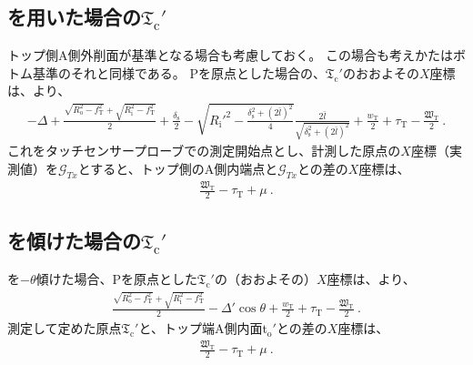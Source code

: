 \clearpage
\modHeadsection{\TopOutcutCenter}


\subsection[\Spacer を用いた場合の\texorpdfstring{$\mathfrak T_\mathrm c'$}{Tc'}]
           {\Spacer を用いた場合の$\boldsymbol{\mathfrak T_\mathrm c'}$}
トップ側A側外削面が基準となる場合も考慮しておく。
この場合も考えかたはボトム基準のそれと同様である。
\TableCenter Pを原点とした場合の、\TopOutcutCenter$\mathfrak T_\mathrm c'$のおおよその$X$座標は、より、
\begin{align*}
  -\Delta+\frac{\sqrt{R_\mathrm o^2-f_\mathrm T^2}+\sqrt{R_\mathrm i^2-f_\mathrm T^2}}2+\frac{\delta_\mathrm s}2
  -\sqrt{R_\mathrm i'^2-\frac{\delta_\mathrm s^2+(2\bar l)^2}4}\frac{2\bar l}{\sqrt{\delta_\mathrm s^2+(2\bar l)^2}}
  +\frac{w_\mathrm T}2+\tau_\mathrm T-\frac{\mathfrak W_\mathrm T}2\ .
\end{align*}
これをタッチセンサープローブでの測定開始点とし、計測した原点の$X$座標（実測値）を$\mathcal G_{Tx}$とすると、トップ側のA側内端点と$\mathcal G_{Tx}$との差の$X$座標は、
\begin{align*}
  \frac{\mathfrak W_\mathrm T}2-\tau_\mathrm T+\mu~.
\end{align*}


\subsection[\Table を傾けた場合の\texorpdfstring{$\mathfrak T_\mathrm c'$}{Tc'}]
           {\Table を傾けた場合の$\boldsymbol{\mathfrak T_\mathrm c'}$}
\Table を$-\theta$傾けた場合、\TableCenter Pを原点とした\TopOutcutCenter$\mathfrak T_\mathrm c'$の（おおよその）$X$座標は、より、
\begin{align}
  \label{eq:gaisakucenterTt}
  \frac{\sqrt{R_\mathrm o^2-f_\mathrm T^2}+\sqrt{R_\mathrm i^2-f_\mathrm T^2}}2-\Delta'\cos\theta
  +\frac{w_\mathrm T}2+\tau_\mathrm T-\frac{\mathfrak W_\mathrm T}2\ .
\end{align}
測定して定めた原点$\mathfrak T_\mathrm c'$と、トップ端A側内面t$_\mathrm o'$との差の$X$座標は、
\begin{align}
  \label{eq:gaisakucenterTr}
  \frac{\mathfrak W_\mathrm T}2-\tau_\mathrm T+\mu~.
\end{align}


